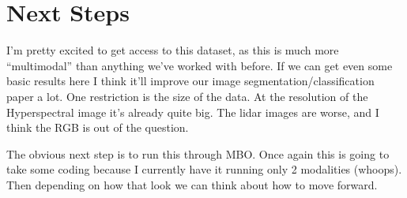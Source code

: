 \documentclass{article}[11pt]
\begin{document}
\section{Next Steps}

I'm pretty excited to get access to this dataset, as this is much more ``multimodal'' than anything we've worked with before. If we can get even some basic results here I think it'll improve our image segmentation/classification paper a lot. One restriction is the size of the data. At the resolution of the Hyperspectral image it's already quite big. The lidar images are worse, and I think the RGB is out of the question.

The obvious next step is to run this through MBO. Once again this is going to take some coding because I currently have it running only 2 modalities (whoops). Then depending on how that look we can think about how to move forward.
\end{document}

